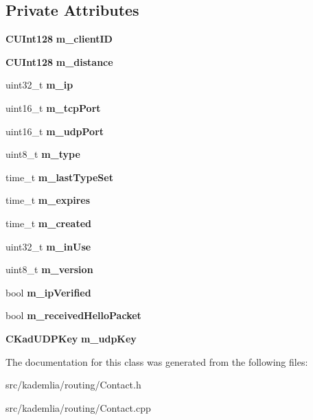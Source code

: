 \subsection*{Private Attributes}
\begin{DoxyCompactItemize}
\item 
{\bf CUInt128} {\bfseries m\_\-clientID}\label{classKademlia_1_1CContact_ab34a1f325be3e90c3f6a0a1d1e365361}

\item 
{\bf CUInt128} {\bfseries m\_\-distance}\label{classKademlia_1_1CContact_a0cefe579cbdc1ed12ce597210b3bf767}

\item 
uint32\_\-t {\bfseries m\_\-ip}\label{classKademlia_1_1CContact_ada1b0117fc0b77321db27788fd14ad2b}

\item 
uint16\_\-t {\bfseries m\_\-tcpPort}\label{classKademlia_1_1CContact_afdf5ab6138649ca5fbf34b84b5b8910f}

\item 
uint16\_\-t {\bfseries m\_\-udpPort}\label{classKademlia_1_1CContact_a7877a8c50145e6261094c1f232c74c26}

\item 
uint8\_\-t {\bfseries m\_\-type}\label{classKademlia_1_1CContact_a948352dbe85f25b02a474c0997990c5a}

\item 
time\_\-t {\bfseries m\_\-lastTypeSet}\label{classKademlia_1_1CContact_a6ea369abbf6aa4163b4818e5841bba08}

\item 
time\_\-t {\bfseries m\_\-expires}\label{classKademlia_1_1CContact_aca44d77f1af82c959d259839844c6f84}

\item 
time\_\-t {\bfseries m\_\-created}\label{classKademlia_1_1CContact_a93d7a021c3e6d305292ca3686ad8022c}

\item 
uint32\_\-t {\bfseries m\_\-inUse}\label{classKademlia_1_1CContact_af6c9da6706f6369a1064aebda391b4ad}

\item 
uint8\_\-t {\bfseries m\_\-version}\label{classKademlia_1_1CContact_a94478ebd4262983daa921a45163bc38e}

\item 
bool {\bfseries m\_\-ipVerified}\label{classKademlia_1_1CContact_acfafe05469a05ba0fb3331eb362f7ebc}

\item 
bool {\bfseries m\_\-receivedHelloPacket}\label{classKademlia_1_1CContact_ad6bb64baa7aff21b610337617ef22ed6}

\item 
{\bf CKadUDPKey} {\bfseries m\_\-udpKey}\label{classKademlia_1_1CContact_a30a0bca358d91e8105f8547970266b38}

\end{DoxyCompactItemize}


The documentation for this class was generated from the following files:\begin{DoxyCompactItemize}
\item 
src/kademlia/routing/Contact.h\item 
src/kademlia/routing/Contact.cpp\end{DoxyCompactItemize}
